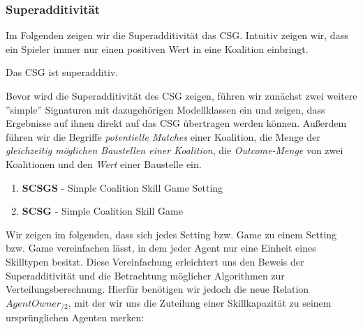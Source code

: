 \subsubsection{Superadditivität}

\label{supadd}
Im Folgenden zeigen wir die Superadditivität das CSG. Intuitiv zeigen wir, dass ein Spieler immer nur einen positiven Wert in eine Koalition einbringt.

\begin{lemma}[Superadditivität]
Das CSG ist superadditiv.
\end{lemma}

Bevor wird die Superadditivität des CSG zeigen, führen wir zunächst zwei weitere ''simple'' Signaturen mit dazugehörigen Modellklassen ein und zeigen, dass Ergebnisse auf ihnen direkt auf das CSG übertragen werden können. Außerdem führen wir die Begriffe \textit{potentielle Matches} einer Koalition, die Menge der \textit{gleichzeitig möglichen Baustellen einer Koalition}, die \textit{Outcome-Menge} von zwei Koalitionen und den \textit{Wert} einer Baustelle ein.

\begin{enumerate}
  \item \textbf{SCSGS} - Simple Coalition Skill Game Setting
  \item \textbf{SCSG} - Simple Coalition Skill Game
\end{enumerate}

\noindent
Wir zeigen im folgenden, dass sich jedes Setting bzw. Game zu einem Setting bzw. Game vereinfachen lässt, in dem jeder Agent nur eine Einheit eines Skilltypen besitzt. Diese Vereinfachung erleichtert uns den Beweis der Superadditivität und die Betrachtung möglicher Algorithmen zur Verteilungsberechnung. Hierfür benötigen wir jedoch die neue Relation $AgentOwner_{/2}$, mit der wir uns die Zuteilung einer Skillkapazität zu seinem ursprünglichen Agenten merken:

